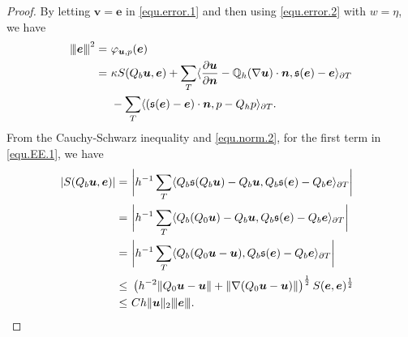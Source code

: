 \documentclass[final,leqno]{siamltex704}
\newcommand{\vertiii}[1]{{\left\vert\kern-0.25ex\left\vert\kern-0.25ex\left\vert #1
    \right\vert\kern-0.25ex\right\vert\kern-0.25ex\right\vert}}
\def\S{{\mathfrak s}}
\begin{document}
\begin{proof}
By letting $\bm{v}=\bm{e}$ in \eqref{equ.error.1} and then using \eqref{equ.error.2} with $w=\eta$, we have
\begin{equation}\label{equ.EE.1}
\begin{split}
\vertiii{\bm{e}}^2=&\ \varphi_{\bm{u},p}(\bm{e})\\
=&\ \kappa {S}(Q_b\bm{u},\bm{e}) + \sum_{T}\langle \frac{\partial \bm{u}}{\partial \bm{n}}- \mathbb{Q}_h(\nabla \bm{u})\cdot\bm{n},\S(\bm{e})-\bm{e}\rangle_{\partial T}\\
&\ - \sum_{T} \langle (\S(\bm{e})-\bm{e})\cdot \bm{n},p - Q_h p\rangle_{\partial T}.
\end{split}
\end{equation}
From the Cauchy-Schwarz inequality and \eqref{equ.norm.2}, for the first term in \eqref{equ.EE.1}, we have
\begin{equation} \label{eq.EE.H1.1}
\begin{split}
|S(Q_b\bm{u},\bm{e})|=&\ \bigg|h^{-1}\sum_T \langle Q_b\S(Q_b\bm{u})- Q_b\bm{u}, Q_b\S(\bm{e})-Q_b\bm{e}\rangle_{\partial T}\bigg|~~\\
=&\ \bigg|h^{-1}\sum_T \langle Q_b(Q_0\bm{u})- Q_b\bm{u}, Q_b\S(\bm{e})-Q_b\bm{e}\rangle_{\partial T}\bigg|\\
=&\ \bigg|h^{-1}\sum_T \langle Q_b(Q_0\bm{u}- \bm{u}), Q_b\S(\bm{e})-Q_b\bm{e}\rangle_{\partial T}\bigg|\\
\leq &\ \left(h^{-2}\|Q_0\bm{u}- \bm{u}\| +\|\nabla(Q_0\bm{u}- \bm{u})\| \right)^{\frac{1}{2}} S(\bm{e},\bm{e})^{\frac{1}{2}}\\
\leq &\ C h\|\bm{u}\|_2 \vertiii{\bm{e}}.
\end{split}
\end{equation}


\end{proof}
\end{document}

